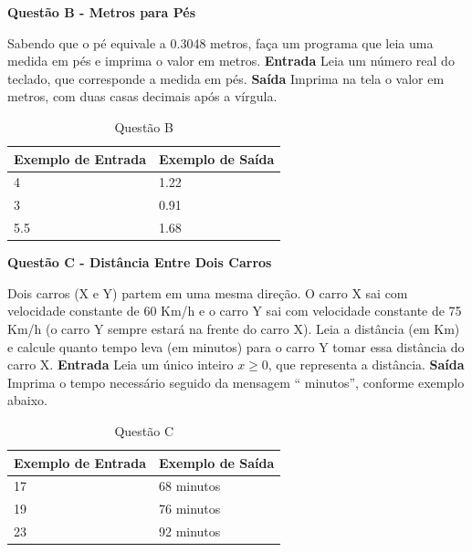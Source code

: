 \documentclass[a4paper, 12pt]{article}
\begin{document}
\newpage %
\begin{center}
\textbf{{\Large Questão B - Metros para Pés}}
\end{center}
\vspace{5pt}
Sabendo que o pé equivale a 0.3048 metros, faça um programa que leia uma medida em pés e imprima o valor
em metros.
\newline \newline
\textbf{{\large Entrada}} \newline
Leia um número real do teclado, que corresponde a medida em pés.
\newline \newline
\textbf{{\large Saída}} \newline
Imprima na tela o valor em metros, com duas casas decimais após a vírgula.
\newline
\begin{table}[H]
	\centering
	\begin{tabular}{|l|l|}
	\hline
	\textbf{Exemplo de Entrada} & \textbf{Exemplo de Saída} \\ \hline
	4 & 1.22 \\ \hline
	3 & 0.91 \\ \hline
	5.5 & 1.68 \\ \hline
	\end{tabular}
	\caption{Questão B}
	\label{tabela2}
\end{table}

\newpage %
\begin{center}
\textbf{{\Large Questão C - Distância Entre Dois Carros}}
\end{center}
\vspace{5pt}
Dois carros (X e Y) partem em uma mesma direção. O carro X sai com velocidade constante de 60 Km/h e o carro Y sai com velocidade constante de 75 Km/h (o carro Y sempre estará na frente do carro X). \newline
Leia a distância (em Km) e calcule quanto tempo leva (em minutos) para o carro Y tomar essa distância do carro X.
\newline \newline
\textbf{{\large Entrada}} \newline
Leia um único inteiro $x \geq 0$, que representa a distância.
\newline \newline
\textbf{{\large Saída}} \newline
Imprima o tempo necessário seguido da mensagem `` minutos'', conforme exemplo abaixo.
\newline
\begin{table}[H]
	\centering
	\begin{tabular}{|l|l|}
	\hline
	\textbf{Exemplo de Entrada} & \textbf{Exemplo de Saída} \\ \hline
	17 & 68 minutos \\ \hline
	19 & 76 minutos \\ \hline
	23 & 92 minutos \\ \hline
	\end{tabular}
	\caption{Questão C}
	\label{tabela3}
\end{table}
\end{document}
